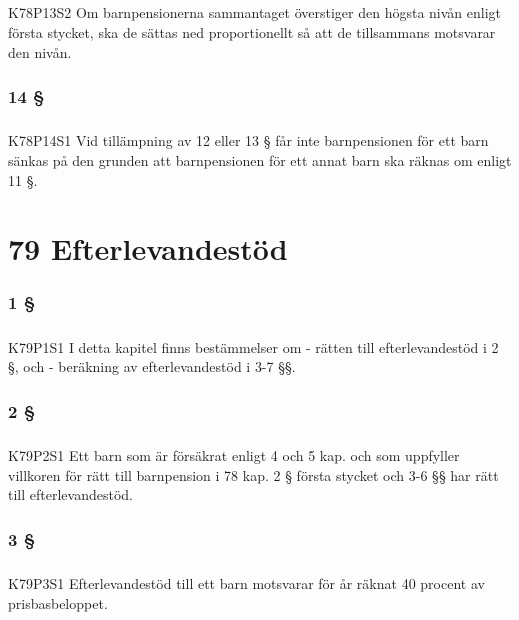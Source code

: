 \documentclass[a4paper,notitlepage,openany,10pt]{book}
\begin{document}
\paragraph*{}
{\tiny K78P13S2}
Om barnpensionerna sammantaget överstiger den högsta nivån enligt första stycket, ska de sättas ned proportionellt så att de tillsammans motsvarar den nivån.
\subsection*{14 §}
\paragraph*{}
{\tiny K78P14S1}
Vid tillämpning av 12 eller 13 § får inte barnpensionen för ett barn sänkas på den grunden att barnpensionen för ett annat barn ska räknas om enligt 11 §.
\chapter*{79 Efterlevandestöd}
\subsection*{1 §}
\paragraph*{}
{\tiny K79P1S1}
I detta kapitel finns bestämmelser om
\newline - rätten till efterlevandestöd i 2 §, och
\newline - beräkning av efterlevandestöd i 3-7 §§.
\subsection*{2 §}
\paragraph*{}
{\tiny K79P2S1}
Ett barn som är försäkrat enligt 4 och 5 kap. och som uppfyller villkoren för rätt till barnpension i 78 kap. 2 § första stycket och 3-6 §§ har rätt till efterlevandestöd.
\subsection*{3 §}
\paragraph*{}
{\tiny K79P3S1}
Efterlevandestöd till ett barn motsvarar för år räknat 40 procent av prisbasbeloppet.
\end{document}
